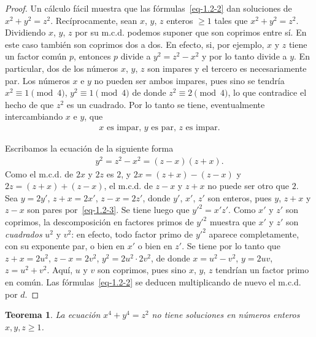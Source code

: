 \documentclass[10pt,oneside,bibtotoc,smallheadings,leqno,a5paper,DIV=12]{scrbook}
\newcommand{\QED}{}%
\numberwithin{equation}{section}
\theoremstyle{defi}
\theoremstyle{enonce}
\newtheorem{theorem}{Teorema}
\theoremstyle{rem}
\numberwithin{theorem}{section}
\numberwithin{proposition}{section}
\numberwithin{definition}{section}
\numberwithin{lemma}{section}
\numberwithin{corollary}{section}
\numberwithin{example}{section}
\numberwithin{footnote}{section}%
\begin{document}
\begin{proof}
Un c\'alculo f\'acil muestra que las f\'ormulas~\eqref{eq-1.2-2} dan soluciones
de $x^{2}+y^{2}=z^{2}$.
Rec\'iprocamente, sean $x$, $y$, $z$ enteros $\geq 1$ tales que $x^{2}+y^{2}=z^{2}$. Dividiendo
$x$, $y$, $z$ por su m.c.d. podemos suponer que son coprimos entre s\'i. En este caso tambi\'en
son coprimos dos a dos. En efecto, si, por ejemplo, $x$ y $z$ tiene un factor com\'un $p$, entonces
$p$ divide a $y^{2} = z^{2}-x^{2}$ y por lo tanto divide a $y$. En particular, dos de
los n\'umeros
$x$, $y$, $z$ son impares y el tercero es necesariamente par. Los n\'umeros $x$ e $y$ no
pueden ser ambos impares, pues sino se tendr\'ia $x^{2}\equiv 1\pmod 4$, $y^{2}\equiv 1\pmod 4$
de donde $z^{2}\equiv 2\pmod 4$, lo que contradice el hecho de que $z^{2}$ es un cuadrado.
Por lo tanto se tiene, eventualmente intercambiando $x$ e $y$, que
\begin{gather}\label{eq-1.2-3}
\text{$x$ es impar, $y$ es par, $z$ es impar.}
\end{gather}

Escribamos la ecuaci\'on de la siguiente forma
\begin{gather}\label{eq-1.2-4}
y^{2} = z^{2}-x^{2} = (z-x)(z+x).
\end{gather}
Como el m.c.d. de $2x$ y $2z$ es $2$, y $2x = (z+x)-(z-x)$ y $2z = (z+x)+(z-x)$, el
m.c.d. de $z-x$ y $z+x$ no puede ser otro que $2$. Sea $y = 2y'$, $z+x = 2x'$,
$z-x = 2z'$, donde $y'$, $x'$, $z'$ son enteros, pues $y$, $z+x$ y $z-x$ son pares
por~\eqref{eq-1.2-3}. Se tiene luego que $y'^{2} = x'z'$. Como $x'$ y $z'$ son coprimos, la descomposici\'on
en factores primos de $y'^{2}$ muestra que $x'$ y $z'$ son {\em cuadrados} $u^{2}$ y $v^{2}$:
en efecto, todo factor primo de $y'^{2}$ aparece completamente, con su exponente par,
o bien en $x'$ o bien en $z'$. Se tiene por lo tanto que $z+x = 2u^{2}$, $z-x = 2v^{2}$,
$y^{2} = 2u^{2}\cdot 2v^{2}$, de donde $x = u^{2}-v^{2}$, $y=2uv$, $z=u^{2}+v^{2}$. Aqu\'i,
$u$ y $v$ son coprimos, pues sino $x$, $y$, $z$ tendr\'ian un factor primo en com\'un. Las
f\'ormulas~\eqref{eq-1.2-2} se deducen multiplicando de nuevo el m.c.d. por $d$. %
\end{proof}

\begin{theorem}\label{teo2.2.2}
La ecuaci\'on $x^{4}+y^{4}=z^{2}$ no tiene soluciones en n\'umeros enteros $x, y, z \geq 1$.
\end{theorem}
\end{document}
